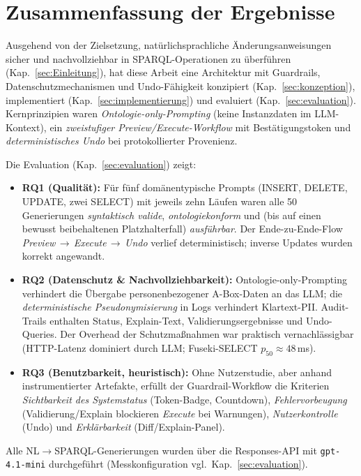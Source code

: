 \section{Zusammenfassung der Ergebnisse}
Ausgehend von der Zielsetzung, natürlichsprachliche Änderungsanweisungen sicher und nachvollziehbar in SPARQL-Operationen zu überführen (Kap.~\ref{sec:Einleitung}), hat diese Arbeit eine Architektur mit Guardrails, Datenschutzmechanismen und Undo-Fähigkeit konzipiert (Kap.~\ref{sec:konzeption}), implementiert (Kap.~\ref{sec:implementierung}) und evaluiert (Kap.~\ref{sec:evaluation}). Kernprinzipien waren \emph{Ontologie-only-Prompting} (keine Instanzdaten im LLM-Kontext), ein \emph{zweistufiger Preview/Execute-Workflow} mit Bestätigungstoken und \emph{deterministisches Undo} bei protokollierter Provenienz.

Die Evaluation (Kap.~\ref{sec:evaluation}) zeigt:
\begin{itemize}
  \item \textbf{RQ1 (Qualität):} Für fünf domänentypische Prompts (INSERT, DELETE, UPDATE, zwei SELECT) mit jeweils zehn Läufen waren alle 50 Generierungen \emph{syntaktisch valide}, \emph{ontologiekonform} und (bis auf einen bewusst beibehaltenen Platzhalterfall) \emph{ausführbar}. Der Ende-zu-Ende-Flow \emph{Preview}\,$\to$\,\emph{Execute}\,$\to$\,\emph{Undo} verlief deterministisch; inverse Updates wurden korrekt angewandt.
  \item \textbf{RQ2 (Datenschutz \& Nachvollziehbarkeit):} Ontologie-only-Prompting verhindert die Übergabe personenbezogener A-Box-Daten an das LLM; die \emph{deterministische Pseudonymisierung} in Logs verhindert Klartext-PII. Audit-Trails enthalten Status, Explain-Text, Validierungsergebnisse und Undo-Queries. Der Overhead der Schutzmaßnahmen war praktisch vernachlässigbar (HTTP-Latenz dominiert durch LLM; Fuseki-SELECT $p_{50}\approx 48$\,ms).
  \item \textbf{RQ3 (Benutzbarkeit, heuristisch):} Ohne Nutzerstudie, aber anhand instrumentierter Artefakte, erfüllt der Guardrail-Workflow die Kriterien \emph{Sichtbarkeit des Systemstatus} (Token-Badge, Countdown), \emph{Fehlervorbeugung} (Validierung/Explain blockieren \emph{Execute} bei Warnungen), \emph{Nutzerkontrolle} (Undo) und \emph{Erklärbarkeit} (Diff/Explain-Panel).
\end{itemize}
Alle NL$\to$SPARQL-Generierungen wurden über die Responses-API mit \texttt{gpt-4.1-mini} durchgeführt (Messkonfiguration vgl.\ Kap.~\ref{sec:evaluation}).


